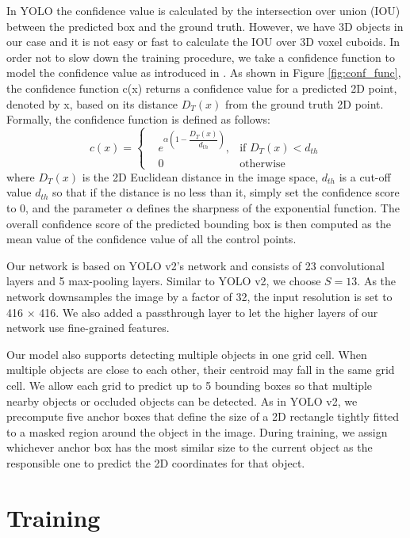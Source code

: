 In YOLO the confidence value is calculated by the intersection over union (IOU) between the predicted box and the ground truth. However, we have 3D objects in our case and it is not easy or fast to calculate the IOU over 3D voxel cuboids. In order not to slow down the training procedure, we take a confidence function to model the confidence value as introduced in \cite{tekin2018real}. As shown in Figure \ref{fig:conf_func}, the confidence function c(x) returns a confidence value for a predicted 2D point, denoted by x, based on its distance $ D_{T}(x) $ from the ground truth 2D point. Formally, the confidence function is defined as follows:
\begin{equation}
\label{eqn:conf_func}
c(x)=\left\{
\begin{aligned}
&e^{\alpha(1-\dfrac{D_{T}(x)}{d_{th}})}, &\text{if } D_{T}(x) < d_{th}\\
&0 &\text{otherwise}
\end{aligned}
\right.
\end{equation}
where $ D_{T}(x) $ is the 2D Euclidean distance in the image space, $ d_{th} $ is a cut-off value $ d_{th} $ so that if the distance is no less than it, simply set the confidence score to 0, and the parameter $ \alpha $ defines the sharpness of the exponential function. The overall confidence score of the predicted bounding box is then computed as the mean value of the confidence value of all the control points.

Our network is based on YOLO v2's network and consists of 23 convolutional layers and 5 max-pooling layers. Similar to YOLO v2, we choose $ S = 13 $. As the network downsamples the image by a factor of 32, the input resolution is set to 416 $ \times $ 416. We also added a passthrough layer to let the higher layers of our network use fine-grained features.

Our model also supports detecting multiple objects in one grid cell. When multiple objects are close to each other, their centroid may fall in the same grid cell. We allow each grid to predict up to 5 bounding boxes so that multiple nearby objects or occluded objects can be detected. As in YOLO v2, we precompute five anchor boxes that define the size of a 2D rectangle tightly fitted to a masked region around the object in the image. During training, we assign whichever anchor box has the most similar size to the current object as the responsible one to predict the 2D coordinates for that object.

\section{Training}

